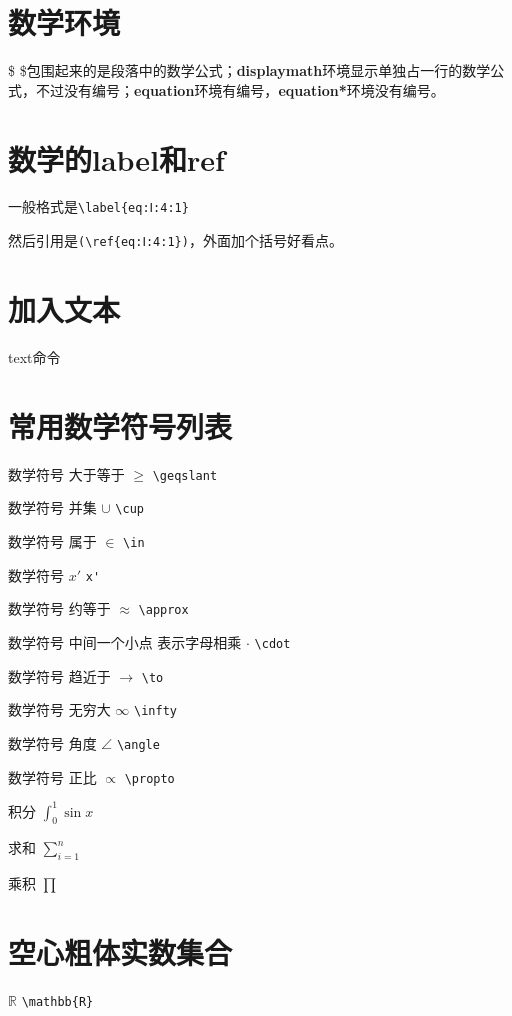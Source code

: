 \documentclass[12pt,oneside]{book}
\begin{document}
\begin{common-format}
\mainmatter

\section{数学环境}
\$ \$包围起来的是段落中的数学公式；\textbf{displaymath}环境显示单独占一行的数学公式，不过没有编号；\textbf{equation}环境有编号，\textbf{equation*}环境没有编号。

\section{数学的label和ref}
一般格式是\verb+\label{eq:Ⅰ:4:1}+

然后引用是\verb+(\ref{eq:Ⅰ:4:1})+，外面加个括号好看点。


\section{加入文本}
text命令

\section{常用数学符号列表}
数学符号 大于等于 $\geqslant$  \verb+\geqslant+

数学符号 并集 $\cup$  \verb+\cup+

数学符号 属于  $\in$  \verb+\in+

数学符号 $x'$  \verb+x'+

数学符号 约等于  $\approx$ \verb+\approx+

数学符号 中间一个小点 表示字母相乘 $\cdot$  \verb+\cdot+

数学符号 趋近于  $\to$ \verb+\to+

数学符号 无穷大 $\infty$  \verb+\infty+

数学符号 角度 $\angle$ \verb+\angle+

数学符号  正比  $\propto$ \verb+\propto+

积分 $\int_{0}^{1}\sin x$

求和 $\sum_{i=1}^{n}$

乘积 $\prod$





\section{空心粗体实数集合}
$\mathbb{R}$  \verb+\mathbb{R}+


\end{common-format}
\end{document}
